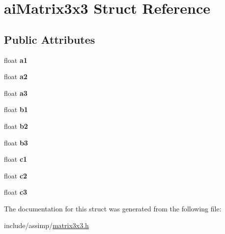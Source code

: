 \hypertarget{structaiMatrix3x3}{\section{ai\-Matrix3x3 \-Struct \-Reference}
\label{structaiMatrix3x3}
}
\subsection*{\-Public \-Attributes}
\begin{DoxyCompactItemize}
\item 
\hypertarget{structaiMatrix3x3_a6884258a2f50758ed8b554b531186917}{float {\bfseries a1}}\label{structaiMatrix3x3_a6884258a2f50758ed8b554b531186917}

\item 
\hypertarget{structaiMatrix3x3_a4c74733870193040ba4953fb673e77df}{float {\bfseries a2}}\label{structaiMatrix3x3_a4c74733870193040ba4953fb673e77df}

\item 
\hypertarget{structaiMatrix3x3_a851d391df32a39e1ced1a9a286b38cf4}{float {\bfseries a3}}\label{structaiMatrix3x3_a851d391df32a39e1ced1a9a286b38cf4}

\item 
\hypertarget{structaiMatrix3x3_a9eeba340d3502017caad70416f03863a}{float {\bfseries b1}}\label{structaiMatrix3x3_a9eeba340d3502017caad70416f03863a}

\item 
\hypertarget{structaiMatrix3x3_a9f5e25b60bbd7bdf8f0a19cd82cc6b15}{float {\bfseries b2}}\label{structaiMatrix3x3_a9f5e25b60bbd7bdf8f0a19cd82cc6b15}

\item 
\hypertarget{structaiMatrix3x3_a21aa4345fe6ce2774db94d118c536d02}{float {\bfseries b3}}\label{structaiMatrix3x3_a21aa4345fe6ce2774db94d118c536d02}

\item 
\hypertarget{structaiMatrix3x3_ae62a2877076cbee151e89cb34567e3ca}{float {\bfseries c1}}\label{structaiMatrix3x3_ae62a2877076cbee151e89cb34567e3ca}

\item 
\hypertarget{structaiMatrix3x3_a8e0d85d5c46eb4f4478f1fe159be4320}{float {\bfseries c2}}\label{structaiMatrix3x3_a8e0d85d5c46eb4f4478f1fe159be4320}

\item 
\hypertarget{structaiMatrix3x3_aa7eef894dec22db1011092410b24f19b}{float {\bfseries c3}}\label{structaiMatrix3x3_aa7eef894dec22db1011092410b24f19b}

\end{DoxyCompactItemize}


\-The documentation for this struct was generated from the following file\-:\begin{DoxyCompactItemize}
\item 
include/assimp/\hyperlink{matrix3x3_8h}{matrix3x3.\-h}\end{DoxyCompactItemize}

